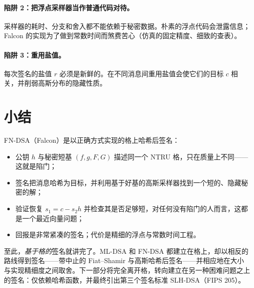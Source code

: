 \paragraph{陷阱 2：把浮点采样器当作普通代码对待。}
采样器的耗时、分支和舍入都不能依赖于秘密数据。朴素的浮点代码会泄露信息；Falcon 的实现为了做到常数时间而煞费苦心（仿真的固定精度、细致的查表）。

\paragraph{陷阱 3：重用盐值。}
每次签名的盐值 $r$ 必须是新鲜的。在不同消息间重用盐值会使它们的目标 $c$ 相关，并削弱高斯分布的隐藏性质。

\section{小结}

FN-DSA（Falcon）是以正确方式实现的格上哈希后签名：

\begin{itemize}
  \item 公钥 $h$ 与秘密短基 $(f,g,F,G)$ 描述同一个 NTRU 格，只在质量上不同——这就是陷门；
  \item 签名把消息哈希为目标，并利用基于好基的高斯采样器找到一个短的、隐藏秘密的解；
  \item 验证恢复 $s_1=c-s_2 h$ 并检查其是否足够短，对任何没有陷门的人而言，这都是一个最近向量问题；
  \item 回报是非常紧凑的签名；代价是精细的浮点与常数时间工程。
\end{itemize}

至此，\emph{基于格的}签名就讲完了。ML-DSA 和 FN-DSA 都建立在格上，却以相反的路线得到签名——带中止的 Fiat--Shamir 与高斯哈希后签名——并相应地在大小与实现精细度之间取舍。下一部分将完全离开格，转向建立在另一种困难问题之上的签名：仅依赖哈希函数，并最终引出第三个签名标准 SLH-DSA（FIPS 205）。

\printbibliography[heading=chapterrefs]
